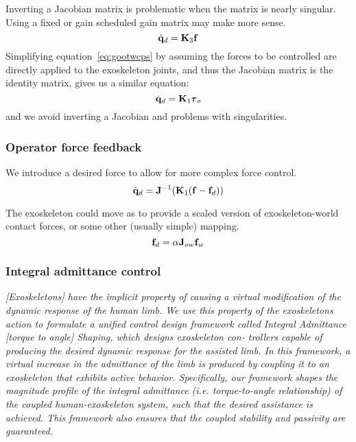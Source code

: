 \documentclass[letterpaper,12pt,fullpage]{article}
\begin{document}
Inverting a Jacobian matrix is problematic when the matrix is
nearly singular.
Using a fixed or gain scheduled gain matrix may make more sense.
\begin{equation}
\dot{{\bf q}}_d = {\bf K}_3 {\bf f}
\end{equation}
Simplifying equation~\ref{eq:gootwcps}
by assuming the forces to be controlled
are directly applied to the exoskeleton joints, and thus the Jacobian matrix
is the identity matrix, gives us a similar equation:
\begin{equation}
\dot{\vq}_d = \mK_1 \vtau_o
\end{equation}
and we avoid inverting a Jacobian and problems with singularities.

\subsubsection{Operator force feedback}

We introduce a desired force to allow for more complex force control.
\begin{equation}
\dot{{\bf q}}_d = {\bf J}^{-1} ({\bf K}_1 ({\bf f} - {\bf f}_d))
\end{equation}

The exoskeleton could move as to provide a scaled version of exoskeleton-world
contact forces, or some other (usually simple) mapping. 
\begin{equation}
{\bf f}_d = \alpha {\bf J}_{ow} {\bf f}_w
\end{equation}

\subsubsection{Integral admittance control}

{\it [Exoskeletons] have the implicit property
of causing a virtual modification of the dynamic response of
the human limb. We use this property of the exoskeletons
action to formulate a unified control design framework called
Integral Admittance [torque to angle] Shaping, which designs exoskeleton con-
trollers capable of producing the desired dynamic response
for the assisted limb. In this framework, a virtual increase
in the admittance of the limb is produced by coupling it
to an exoskeleton that exhibits active behavior. Specifically,
our framework shapes the magnitude profile of the integral
admittance (i.e. torque-to-angle relationship) of the coupled
human-exoskeleton system, such that the desired assistance is
achieved. This framework also ensures that the coupled stability
and passivity are guaranteed.}~\cite{Nagarajan_etal_2015}
\end{document}
